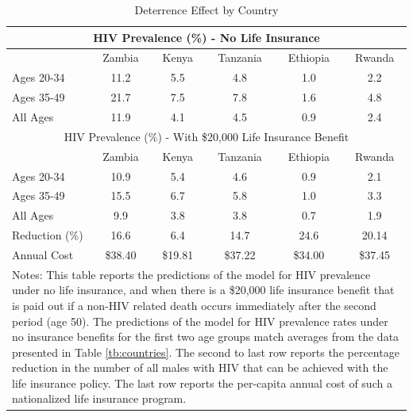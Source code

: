 \documentclass[12pt]{article}
\begin{document}
\begin{table}
\begin{center}
\caption{Deterrence Effect by Country}\label{tb:deterrence}
\vspace*{1pc}
\begin{tabular}{l|ccccc}\hline\hline
\multicolumn{6}{c}{HIV Prevalence (\%) - No Life Insurance}    \\\hline
               & Zambia & Kenya   & Tanzania & Ethiopia & Rwanda  \\\hline
Ages 20-34     & 11.2   & 5.5     & 4.8      & 1.0      & 2.2     \\
Ages 35-49     & 21.7   & 7.5     & 7.8      & 1.6      & 4.8     \\
All Ages       & 11.9   & 4.1     & 4.5      & 0.9      & 2.4     \\ \hline \hline
\multicolumn{6}{c}{HIV Prevalence (\%) - With \$20,000 Life Insurance Benefit} \\\hline
               & Zambia & Kenya   & Tanzania & Ethiopia & Rwanda  \\\hline
Ages 20-34     & 10.9   & 5.4     & 4.6      & 0.9      & 2.1     \\
Ages 35-49     & 15.5   & 6.7     & 5.8      & 1.0      & 3.3     \\
All Ages       & 9.9    & 3.8     & 3.8      & 0.7      & 1.9     \\ \hline
Reduction (\%) & 16.6   & 6.4     & 14.7     & 24.6     & 20.14   \\ \hline
Annual Cost    & \$38.40 & \$19.81 & \$37.22  & \$34.00  & \$37.45 \\ \hline\hline
\multicolumn{6}{p{4.7in}}{
\footnotesize{Notes: This table reports the predictions of the model for HIV prevalence under no life insurance, and when there is a \$20,000 life insurance benefit that is paid out if a non-HIV related death occurs immediately after the second period (age 50).  The predictions of the model for HIV prevalence rates under no insurance benefits for the first two age groups match averages from the data presented in Table \ref{tb:countries}.  The second to last row reports the percentage reduction in the number of all males with HIV that can be achieved with the life insurance policy.  The last row reports the per-capita annual cost of such a nationalized life insurance program.}
}

\end{tabular}
\end{center}
\end{table}
\end{document}
